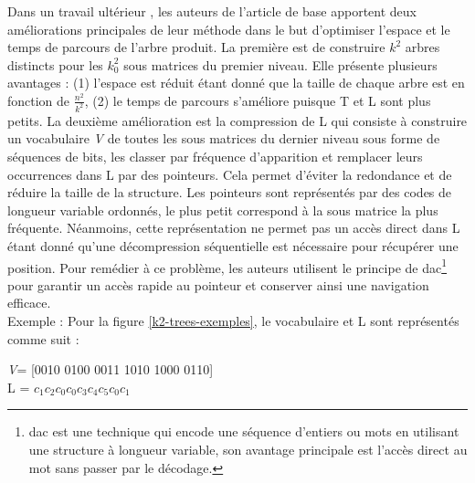 Dans un travail ultérieur \citep{brisaboa2014compact}, les auteurs de l'article de base apportent deux améliorations principales de leur méthode dans le but d'optimiser l'espace et le temps de parcours de l'arbre produit. La première est de construire $k^2$ arbres distincts pour les $k_{0}^{2}$ sous matrices du premier niveau. Elle présente plusieurs avantages : (1) l'espace est réduit étant donné que la taille de chaque arbre est en fonction de $\frac{n^2}{k^2}$, (2) le temps de parcours s'améliore puisque T et L sont plus petits. La deuxième amélioration est la compression de L qui consiste à construire un vocabulaire \textit{V} de toutes les sous matrices du dernier niveau sous forme de séquences de bits, les classer par fréquence d'apparition et remplacer leurs occurrences dans L par des pointeurs. Cela permet d'éviter la redondance et de réduire la taille de la structure. Les pointeurs sont représentés par des codes de longueur variable ordonnés, le plus petit correspond à la sous matrice la plus fréquente. Néanmoins, cette représentation ne permet pas un accès direct dans L étant donné qu'une décompression séquentielle est nécessaire pour récupérer une position. Pour remédier à ce problème, les auteurs utilisent le principe de
 \gls{dac}\footnote{\gls{dac} est une technique qui encode une séquence d'entiers ou mots en utilisant une structure à longueur variable, son avantage principale est l'accès direct au mot sans passer par le décodage.} \citep{brisaboa2013dacs} pour garantir un accès rapide au pointeur et conserver ainsi une navigation efficace.\\
Exemple : Pour la figure \ref{k2-trees-exemples}, le vocabulaire et L sont représentés comme suit :\\
\begin{center}
\textit{V}= [0010 0100 0011 1010 1000 0110]\\
L = $c_{1}c_{2}c_{0}c_{0}c_{3}c_{4}c_{5}c_{0}c_{1}$ \\
\end{center}

